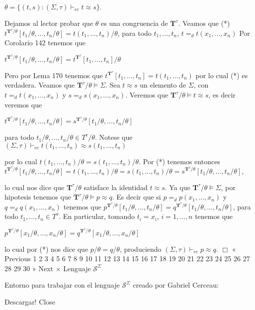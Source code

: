 \(\displaystyle \theta =\{(t,s):(\Sigma ,\tau )\vdash _{ec}t\approx s\}. \)

Dejamos al lector probar que \(\theta \) es una congruencia de \(\mathbf{T} ^{\tau }\). Veamos que
(*) \(t^{\mathbf{T}^{\tau }/\theta }[t_{1}/\theta ,...,t_{n}/\theta ]=t(t_{1},...,t_{n})/\theta \), para todo \(t_{1},...,t_{n}\), \( t=_{d}t(x_{1},...,x_{n})\)
Por Corolario 142 tenemos que

\(\displaystyle t^{\mathbf{T}^{\tau }/\theta }[t_{1}/\theta ,...,t_{n}/\theta ]=t^{\mathbf{T} ^{\tau }}[t_{1},...,t_{n}]/\theta \)

Pero por Lema 170 tenemos que \(t^{\mathbf{T}^{\tau }}[t_{1},...,t_{n}]=t(t_{1},...,t_{n})\) por lo cual (*) es verdadera.
Veamos que \(\mathbf{T}^{\tau }/\theta \models \Sigma .\) Sea \(t\approx s\) un elemento de \(\Sigma \), con \(t=_{d}t(x_{1},...,x_{n})\) y \( s=_{d}s(x_{1},...,x_{n}).\) Veremos que \(\mathbf{T}^{\tau }/\theta \models t\approx s\), es decir veremos que

\(\displaystyle t^{\mathbf{T}^{\tau }/\theta }[t_{1}/\theta ,...,t_{n}/\theta ]=s^{\mathbf{T} ^{\tau }/\theta }[t_{1}/\theta ,...,t_{n}/\theta ] \)

para todo \(t_{1}/\theta ,...,t_{n}/\theta \in T^{\tau }/\theta \). Notese que
\(\displaystyle (\Sigma ,\tau )\vdash _{ec}t(t_{1},...,t_{n})\approx s(t_{1},...,t_{n}) \)

por lo cual \(t(t_{1},...,t_{n})/\theta =s(t_{1},...,t_{n})/\theta .\) Por (*) tenemos entonces
\(\displaystyle t^{\mathbf{T}^{\tau }/\theta }[t_{1}/\theta ,...,t_{n}/\theta ]=t(t_{1},...,t_{n})/\theta =s(t_{1},...,t_{n})/\theta =s^{\mathbf{T}^{\tau }/\theta }[t_{1}/\theta ,...,t_{n}/\theta ], \)

lo cual nos dice que \(\mathbf{T}^{\tau }/\theta \) satisface la identidad \( t\approx s.\)
Ya que \(\mathbf{T}^{\tau }/\theta \models \Sigma \), por hipotesis tenemos que \(\mathbf{T}^{\tau }/\theta \models p\approx q.\) Es decir que si \( p=_{d}p(x_{1},...,x_{n})\) y \(q=_{d}q(x_{1},...,x_{n})\) tenemos que \(p^{ \mathbf{T}^{\tau }/\theta }[t_{1}/\theta ,...,t_{n}/\theta ]=q^{\mathbf{T} ^{\tau }/\theta }[t_{1}/\theta ,...,t_{n}/\theta ]\), para todo \( t_{1},...,t_{n}\in T^{\tau }\). En particular, tomando \(t_{i}=x_{i}\), \( i=1,...,n\) tenemos que

\(\displaystyle p^{\mathbf{T}^{\tau }/\theta }[x_{1}/\theta ,...,x_{n}/\theta ]=q^{\mathbf{T} ^{\tau }/\theta }[x_{1}/\theta ,...,x_{n}/\theta ] \)

lo cual por (*) nos dice que \(p/\theta =q/\theta \), produciendo \((\Sigma ,\tau )\vdash _{ec}p\approx q\). \(\Box\)
« Previous
1
2
3
4
5
6
7
8
9
10
11
12
13
14
15
16
17
18
19
20
21
22
23
24
25
26
27
28
29
30
» Next
×
Lenguaje \(\mathcal{S}^{\Sigma }\)

Entorno para trabajar con el lenguaje \(\mathcal{S}^{\Sigma }\) creado por Gabriel Cerceau:

Descargar!
Close
